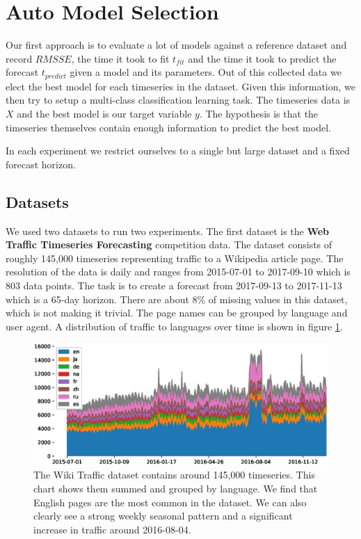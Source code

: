 \section{Auto Model Selection}
\label{sec:autoModelSelection}

Our first approach is to evaluate a lot of models against a reference dataset and record \(RMSSE\), the time it took to fit \(t_{fit}\) and the time it took to predict the forecast \(t_{predict}\) given a model and its parameters. Out of this collected data we elect the best model for each timeseries in the dataset. Given this information, we then try to setup a multi-class classification learning task. The timeseries data is \(X\) and the best model is our target variable \(y\). The hypothesis is that the timeseries themselves contain enough information to predict the best model.

In each experiment we restrict ourselves to a single but large dataset and a fixed forecast horizon.

\subsection{Datasets}

We used two datasets to run two experiments. The first dataset is the \textbf{Web Traffic Timeseries Forecasting} competition \cite{web-traffic-competition} data. The dataset consists of roughly 145,000 timeseries representing traffic to a Wikipedia article page. The resolution of the data is daily and ranges from 2015-07-01 to 2017-09-10 which is 803 data points. The task is to create a forecast from 2017-09-13 to 2017-11-13 which is a 65-day horizon. There are about 8\% of missing values in this dataset, which is not making it trivial. The page names can be grouped by language and user agent. A distribution of traffic to languages over time is shown in figure \ref{fig:wiki_lang_distribution}.


\begin{figure}
\centerline{\includegraphics[scale=.6]{Figures/wiki_lang_distribution.eps}}
\caption{The Wiki Traffic dataset contains around 145,000 timeseries. This chart shows them summed and grouped by language. We find that English pages are the most common in the dataset. We can also clearly see a strong weekly seasonal pattern and a significant increase in traffic around 2016-08-04.}
\label{fig:wiki_lang_distribution}
\end{figure}

